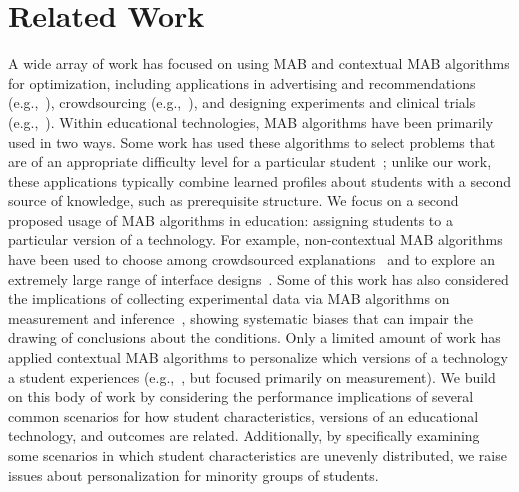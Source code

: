 \section{Related Work}

A wide array of work has focused on using MAB and contextual MAB algorithms for optimization, including applications in advertising and recommendations (e.g.,~\cite{li2010contextual}), crowdsourcing (e.g.,~\cite{jain2014multiarmed}), and designing experiments and clinical trials (e.g.,~\cite{villar2015multi}). Within educational technologies, MAB algorithms have been primarily used in two ways. Some work has used these algorithms to select problems that are of an appropriate difficulty level for a particular student~\cite{clement2015multi,lan2016contextual,segal2018combining}; unlike our work, these applications typically combine learned profiles about students with a second source of knowledge, such as prerequisite structure. 
We focus on a second proposed usage of MAB algorithms in education: assigning students to a particular version of a technology. For example, non-contextual MAB algorithms have been used to choose among crowdsourced explanations~\cite{williams2016axis} and to explore an extremely large range of interface designs~\cite{lomas2016interface}. Some of this work has also considered the implications of collecting experimental data via MAB algorithms on measurement and inference~\cite{liu2014trading,rafferty2019statistical}, showing systematic biases that can impair the drawing of conclusions about the conditions. Only a limited amount of work has applied contextual MAB algorithms to personalize which versions of a technology a student experiences (e.g.,~\cite{shaikh2019balancing}, but focused primarily on measurement). We build on this body of work by considering the performance implications of several common scenarios for how student characteristics, versions of an educational technology, and outcomes are related. Additionally, by specifically examining some scenarios in which student characteristics are unevenly distributed, we raise issues about personalization for minority groups of students. 

